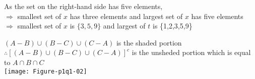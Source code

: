 \documentclass[answers]{exam}
\begin{document}

\begin{solution}\label{p1q1-01}
As the set on the right-hand side has five elements,\\
$\Rightarrow$ smallest set of $ x $ has three elements and largest set of $ x $ has five elements\\
$\Rightarrow $ smallest set of $ x $ is $\{3,5,9\}$ and largest of $ t $ is \{1,2,3,5,9\}
\end{solution}

\begin{solution}\label{p1q1-02}
$ (A-B)\cup(B-C)\cup(C-A) $ is the shaded portion\\
$\therefore [(A-B)\cup(B-C)\cup (C-A)]^c$ is the unsheded portion which is equal to $ A\cap B \cap C $\\
\texttt{[image: Figure-p1q1-02]}
\end{solution}
\end{document}
